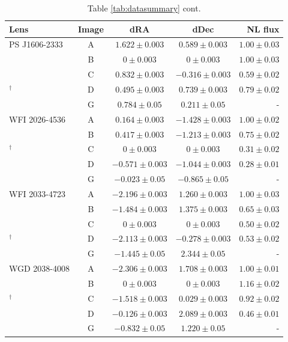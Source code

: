 \begin{table}
	\centering
	\caption[Summary of data (cont.)]{Table \ref{tab:datasummary} cont.}
	\label{tab:datasummarycont}
	\begin{tabular}{lcccr} 
		\hline
		Lens & Image & dRA & dDec & NL flux \\
		\hline
		PS J1606-2333 & A & $1.622 \pm 0.003$& $0.589 \pm 0.003$ & $1.00 \pm 0.03$\\
		\citet{Nierenberg++19}& B & $0 \pm 0.003$& $0 \pm 0.003$ & $1.00 \pm 0.03$\\
		\citet{Shajib++18}& C & $0.832 \pm 0.003$& $-0.316 \pm 0.003$ & $0.59 \pm 0.02$ \\
		$^{\dagger}$\citet{Lemon++18}& D  & $0.495 \pm 0.003$& $0.739 \pm 0.003$ & $0.79 \pm 0.02$ \\
		& G  & $0.784 \pm 0.05$& $0.211 \pm 0.05$ & - \\
		\hline
		WFI 2026-4536 & A & $0.164 \pm 0.003$& $-1.428 \pm 0.003$ & $1.00 \pm 0.02$ \\
		\citet{Nierenberg++19}& B & $0.417\pm 0.003$& $-1.213 \pm 0.003$ & $0.75 \pm 0.02$ \\
		$^{\dagger}$\citet{Morgan++04}& C & $0\pm 0.003$& $0 \pm 0.003$ & $0.31 \pm 0.02$ \\
		& D & $-0.571 \pm 0.003$& $-1.044 \pm 0.003$ & $0.28 \pm 0.01$ \\
		& G & $-0.023 \pm 0.05$ & $-0.865 \pm 0.05$ & - \\
		\hline
		WFI 2033-4723 & A & $-2.196 \pm 0.003$& $1.260 \pm 0.003$ & $1.00 \pm 0.03$ \\
		\citet{Nierenberg++19}& B & $-1.484 \pm 0.003$& $1.375 \pm 0.003$ & $0.65 \pm 0.03$ \\
		\citet{Vuissoz++08}& C & $0\pm 0.003$& $0 \pm 0.003$ & $0.50 \pm 0.02$ \\
		$^{\dagger}$\citet{Morgan++04}& D & $-2.113 \pm 0.003$& $-0.278 \pm 0.003$ & $0.53 \pm 0.02$ \\
		& G & $-1.445 \pm 0.05$& $2.344 \pm 0.05$ & - \\
		\hline
		WGD 2038-4008 & A & $-2.306 \pm 0.003$& $1.708 \pm 0.003$ & $1.00 \pm 0.01$ \\
		\citet{Nierenberg++19}& B & $0\pm 0.003$& $0 \pm 0.003$ & $1.16 \pm 0.02$ \\
		$^{\dagger}$\citet{Agnello++18}& C & $-1.518 \pm 0.003$& $0.029 \pm 0.003$ & $0.92 \pm 0.02$ \\
		& D & $-0.126 \pm 0.003$& $2.089 \pm 0.003$ & $0.46 \pm 0.01$ \\
		& G & $-0.832 \pm 0.05$ & $1.220 \pm 0.05$ & - \\
		\hline
		
	\end{tabular}
\end{table}

%
%

